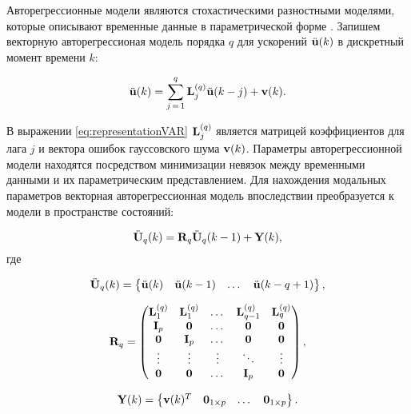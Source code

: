 Авторегрессионные модели являются стохастическими разностными моделями, которые описывают временные данные в параметрической форме \cite{lib:oma:Chen}. Запишем векторную авторегрессионая модель порядка $ q $ для ускорений $ \ddot{\mathbf{u}}(k) $ в дискретный момент времени $ k $:

\begin{equation}
	\ddot{\mathbf{u}}(k) = \sum_{j\,=\,1} ^ q \mathbf{L}_j^{(q)} \ddot{\mathbf{u}}(k - j) + \mathbf{v}(k). \label{eq:representationVAR}
\end{equation}

В выражении \eqref{eq:representationVAR} $ \mathbf{L}_j^{(q)} $ является матрицей коэффициентов для лага $ j $ и вектора ошибок гауссовского шума $ \mathbf{v}(k) $. Параметры авторегрессионной модели находятся посредством минимизации невязок между временными данными и их параметрическим представлением. Для нахождения модальных параметров векторная авторегрессионная модель впоследствии преобразуется к модели в пространстве состояний:

\begin{equation}
	\ddot{\mathbf{U}}_q(k) = \mathbf{R}_q \ddot{\mathbf{U}}_q(k - 1) + \mathbf{Y}(k),
\end{equation} 
где 

\begin{equation}
	 \ddot{\mathbf{U}}_q(k) = \begin{Bmatrix} \ddot{\mathbf{u}}(k) & \ddot{\mathbf{u}}(k - 1) & \dots & \ddot{\mathbf{u}}(k - q + 1) \end{Bmatrix},
\end{equation}

\begin{equation}
	\mathbf{R}_q = 
	\begin{pmatrix}
		\mathbf{L}_1^{(q)} & \mathbf{L}_1^{(q)} & \dots & \mathbf{L}_{q-1}^{(q)} & \mathbf{L}_q^{(q)} \\
		\mathbf{I}_p & \mathbf{0} & \dots & \mathbf{0} & \mathbf{0} \\ 
		\mathbf{0} & \mathbf{I}_p & \dots & \mathbf{0} & \mathbf{0} \\ 
		\vdots & \vdots & \vdots & \ddots & \vdots \\ 
		\mathbf{0} & \mathbf{0} & \dots & \mathbf{I}_p & \mathbf{0} 
	\end{pmatrix},
\end{equation}

\begin{equation}
	\mathbf{Y}(k) = \begin{Bmatrix} \mathbf{v}(k) ^ T & \mathbf{0}_{1 \times p} & \dots & \mathbf{0}_{1 \times p} \end{Bmatrix}.
\end{equation}

